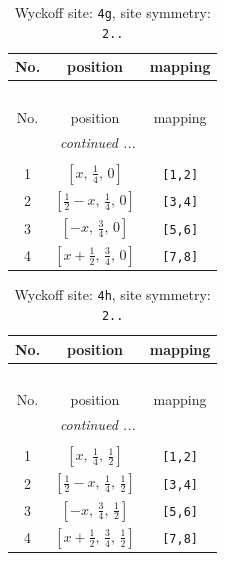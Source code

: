 \documentclass[fleqn,8pt]{jsarticle}
\begin{document}
\renewcommand{\arraystretch}{1.2}
\begin{longtable}{ccc}
\caption{Wyckoff site: {\tt 4g}, site symmetry: {\tt 2..}}
 \\
 \hline \hline
No. & position & mapping \\ \hline \endfirsthead

\multicolumn{2}{l}{\tablename\ \thetable{}} \\
 \hline \hline
No. & position & mapping \\ \hline \endhead

 \hline \hline
\multicolumn{2}{r}{\footnotesize\it continued ...} \\ \endfoot

 \hline \hline
\multicolumn{2}{r}{} \\ \endlastfoot

1 & $\left[ x,\, \frac{1}{4},\, 0 \right]$ & {\tt [1,2]} \\ \hline
2 & $\left[ \frac{1}{2} - x,\, \frac{1}{4},\, 0 \right]$ & {\tt [3,4]} \\ \hline
3 & $\left[ - x,\, \frac{3}{4},\, 0 \right]$ & {\tt [5,6]} \\ \hline
4 & $\left[ x + \frac{1}{2},\, \frac{3}{4},\, 0 \right]$ & {\tt [7,8]} \\
\end{longtable}
\renewcommand{\arraystretch}{1.2}
\begin{longtable}{ccc}
\caption{Wyckoff site: {\tt 4h}, site symmetry: {\tt 2..}}
 \\
 \hline \hline
No. & position & mapping \\ \hline \endfirsthead

\multicolumn{2}{l}{\tablename\ \thetable{}} \\
 \hline \hline
No. & position & mapping \\ \hline \endhead

 \hline \hline
\multicolumn{2}{r}{\footnotesize\it continued ...} \\ \endfoot

 \hline \hline
\multicolumn{2}{r}{} \\ \endlastfoot

1 & $\left[ x,\, \frac{1}{4},\, \frac{1}{2} \right]$ & {\tt [1,2]} \\ \hline
2 & $\left[ \frac{1}{2} - x,\, \frac{1}{4},\, \frac{1}{2} \right]$ & {\tt [3,4]} \\ \hline
3 & $\left[ - x,\, \frac{3}{4},\, \frac{1}{2} \right]$ & {\tt [5,6]} \\ \hline
4 & $\left[ x + \frac{1}{2},\, \frac{3}{4},\, \frac{1}{2} \right]$ & {\tt [7,8]} \\
\end{longtable}
\end{document}
